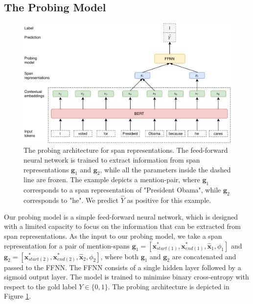 \documentclass[11pt]{article}
\begin{document}
\subsection{The Probing Model}
\begin{figure}[ht]
  \includegraphics[width=\textwidth]{probing_model}
  \caption{The probing architecture for span representations. The feed-forward neural network is trained to extract information from span representations $\pmb{g}_{1}$ and $\pmb{g}_{2}$, while all the parameters inside the dashed line are frozen. The example depicts a mention-pair, where $\pmb{g}_{1}$ corresponds to a span representation of "President Obama", while $\pmb{g}_{2}$ corresponds to "he". We predict $\hat{Y}$ as positive for this example.}
  \label{fig:probing_model}
\end{figure}

Our probing model is a simple feed-forward neural network, which is designed with a limited capacity to focus on the information that can be extracted from span representations.
As the input to our probing model, we take a span representation for a pair of mention-spans $\pmb{g}_{1} = [\pmb{x}_{start(1)}^{*}, \pmb{x}_{end(1)}^{*}, \hat{\pmb{x}}_{1}, \phi_{1}]$ and $\pmb{g}_{2} = [\pmb{x}_{start(2)}^{*}, \pmb{x}_{end(2)}^{*}, \hat{\pmb{x}}_{2}, \phi_{2}]$, where both $\pmb{g}_{1}$ and $\pmb{g}_{2}$ are concatenated and passed to the FFNN. The FFNN consists of a single hidden layer followed by a sigmoid output layer. The model is trained to minimise binary cross-entropy with respect to the gold label $Y \in \{0,1\}$. The probing architecture is depicted in Figure \ref{fig:probing_model}.
\end{document}
